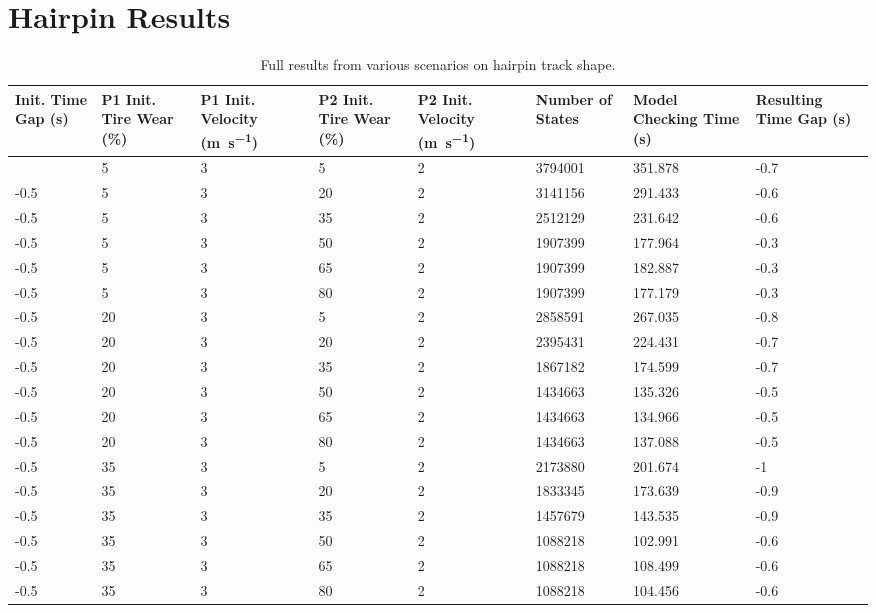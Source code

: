 \section{Hairpin Results}
\begin{longtable}{|p{1.4cm}|p{1.4cm}|p{1.4cm}|p{1.4cm}|p{1.4cm}|p{1.4cm}|p{1.4cm}|p{1.5cm}|}
    \hline
        Init. Time Gap (\si{\second}) & P1 Init. Tire Wear (\%) & P1 Init. Velocity (\si{\meter\per\second}) & P2 Init. Tire Wear (\%) & P2 Init. Velocity (\si{\meter\per\second}) & Number of States & Model Checking Time (\si{\second}) & Resulting Time Gap (\si{\second}) \\ \hline
        \endhead
        \addlinespace
\caption{Full results from various scenarios on hairpin track shape.}
\endlastfoot
        -0.5 & 5 & 3 & 5 & 2 & 3794001 & 351.878 & -0.7 \\ \hline
        -0.5 & 5 & 3 & 20 & 2 & 3141156 & 291.433 & -0.6 \\ \hline
        -0.5 & 5 & 3 & 35 & 2 & 2512129 & 231.642 & -0.6 \\ \hline
        -0.5 & 5 & 3 & 50 & 2 & 1907399 & 177.964 & -0.3 \\ \hline
        -0.5 & 5 & 3 & 65 & 2 & 1907399 & 182.887 & -0.3 \\ \hline
        -0.5 & 5 & 3 & 80 & 2 & 1907399 & 177.179 & -0.3 \\ \hline
        -0.5 & 20 & 3 & 5 & 2 & 2858591 & 267.035 & -0.8 \\ \hline
        -0.5 & 20 & 3 & 20 & 2 & 2395431 & 224.431 & -0.7 \\ \hline
        -0.5 & 20 & 3 & 35 & 2 & 1867182 & 174.599 & -0.7 \\ \hline
        -0.5 & 20 & 3 & 50 & 2 & 1434663 & 135.326 & -0.5 \\ \hline
        -0.5 & 20 & 3 & 65 & 2 & 1434663 & 134.966 & -0.5 \\ \hline
        -0.5 & 20 & 3 & 80 & 2 & 1434663 & 137.088 & -0.5 \\ \hline
        -0.5 & 35 & 3 & 5 & 2 & 2173880 & 201.674 & -1 \\ \hline
        -0.5 & 35 & 3 & 20 & 2 & 1833345 & 173.639 & -0.9 \\ \hline
        -0.5 & 35 & 3 & 35 & 2 & 1457679 & 143.535 & -0.9 \\ \hline
        -0.5 & 35 & 3 & 50 & 2 & 1088218 & 102.991 & -0.6 \\ \hline
        -0.5 & 35 & 3 & 65 & 2 & 1088218 & 108.499 & -0.6 \\ \hline
        -0.5 & 35 & 3 & 80 & 2 & 1088218 & 104.456 & -0.6 \\ \hline

\end{longtable}
